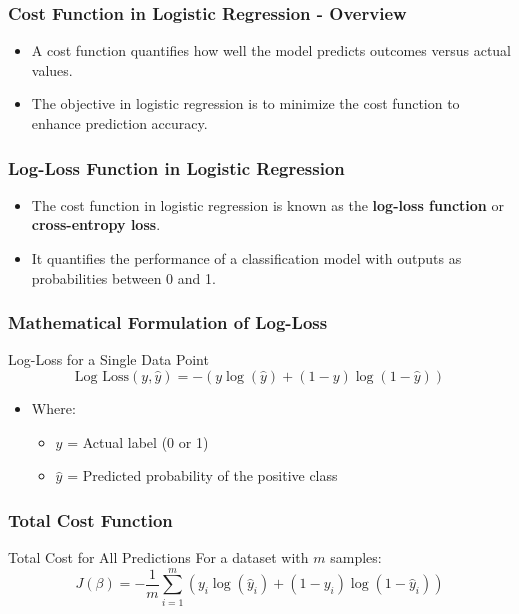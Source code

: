 \documentclass[aspectratio=169]{beamer}
\begin{document}
\begin{frame}[fragile]
    \frametitle{Cost Function in Logistic Regression - Overview}
    \begin{itemize}
        \item A cost function quantifies how well the model predicts outcomes versus actual values.
        \item The objective in logistic regression is to minimize the cost function to enhance prediction accuracy.
    \end{itemize}
\end{frame}

\begin{frame}[fragile]
    \frametitle{Log-Loss Function in Logistic Regression}
    \begin{itemize}
        \item The cost function in logistic regression is known as the \textbf{log-loss function} or \textbf{cross-entropy loss}.
        \item It quantifies the performance of a classification model with outputs as probabilities between 0 and 1.
    \end{itemize}
\end{frame}

\begin{frame}[fragile]
    \frametitle{Mathematical Formulation of Log-Loss}
    \begin{block}{Log-Loss for a Single Data Point}
        \begin{equation}
        \text{Log Loss}(y, \hat{y}) = - \left(y \log(\hat{y}) + (1 - y) \log(1 - \hat{y})\right)
        \end{equation}
    \end{block}
    \begin{itemize}
        \item Where:
        \begin{itemize}
            \item \(y\) = Actual label (0 or 1)
            \item \(\hat{y}\) = Predicted probability of the positive class
        \end{itemize}
    \end{itemize}
\end{frame}

\begin{frame}[fragile]
    \frametitle{Total Cost Function}
    \begin{block}{Total Cost for All Predictions}
        For a dataset with \(m\) samples:
        \begin{equation}
        J(\beta) = -\frac{1}{m} \sum_{i=1}^{m} \left(y_i \log(\hat{y}_i) + (1 - y_i) \log(1 - \hat{y}_i)\right)
        \end{equation}
    \end{block}
\end{frame}
\end{document}
